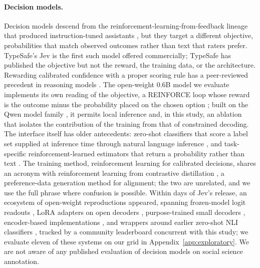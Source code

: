 \documentclass[11pt]{article}
\begin{document}
\paragraph{Decision models.}
Decision models descend from the reinforcement-learning-from-feedback lineage that produced instruction-tuned assistants \citep{christiano2017deep, ouyang2022training, bai2022constitutional}, but they target a different objective, probabilities that match observed outcomes rather than text that raters prefer. TypeSafe's Jev \citep{typesafe2026jev} is the first such model offered commercially; TypeSafe has published the objective but not the reward, the training data, or the architecture. Rewarding calibrated confidence with a proper scoring rule has a peer-reviewed precedent in reasoning models \citep{damani2026beyond}. The open-weight 0.6B model we evaluate implements its own reading of the objective, a REINFORCE loop whose reward is the outcome minus the probability placed on the chosen option \citep{maio2026rlcd}; built on the Qwen model family \citep{qwen2024qwen25}, it permits local inference and, in this study, an ablation that isolates the contribution of the training from that of constrained decoding. The interface itself has older antecedents: zero-shot classifiers that score a label set supplied at inference time through natural language inference \citep{yin2019benchmarking, laurer2023building}, and task-specific reinforcement-learned estimators that return a probability rather than text \citep{nandakishor2025salesrlagent}. The training method, reinforcement learning for calibrated decisions, shares an acronym with reinforcement learning from contrastive distillation \citep{yang2023rlcd}, a preference-data generation method for alignment; the two are unrelated, and we use the full phrase where confusion is possible. Within days of Jev's release, an ecosystem of open-weight reproductions appeared, spanning frozen-model logit readouts \citep{lee2026semif}, LoRA adapters on open decoders \citep{bespoke2026nimble,palmer2026kev}, purpose-trained small decoders \citep{mapika2026decider}, encoder-based implementations \citep{kishor2026laya,panisa2026von,kumar2026verdict}, and wrappers around earlier zero-shot NLI classifiers \citep{wadhwa2026opendecision,laurer2023building}, tracked by a community leaderboard \citep{jevbench2026} concurrent with this study; we evaluate eleven of these systems on our grid in Appendix~\ref{app:exploratory}. We are not aware of any published evaluation of decision models on social science annotation.
\end{document}
